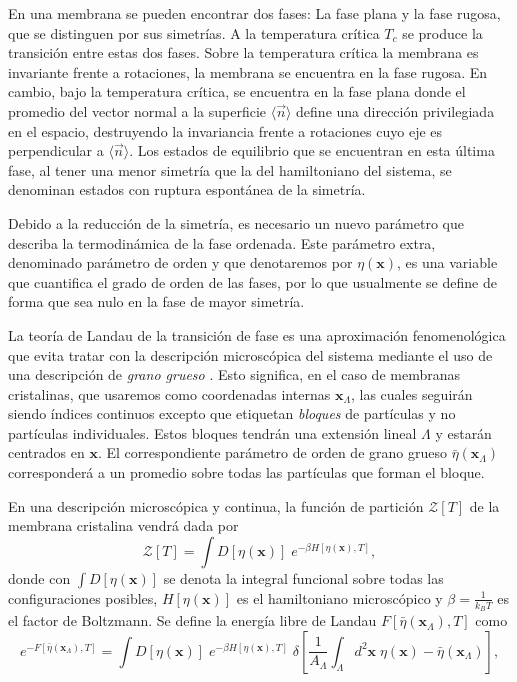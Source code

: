 En una membrana se pueden encontrar dos fases: La fase plana y la fase
rugosa, que se distinguen por sus simetrías. A la temperatura crítica $T_c$ se
produce la transición entre estas dos fases. Sobre la temperatura crítica la
membrana es invariante frente a rotaciones, 
la membrana se encuentra en la fase rugosa. En cambio, bajo la temperatura
crítica, se encuentra en la fase plana donde el promedio del vector normal a
la superficie $\langle \vec{n}\rangle$ define una dirección privilegiada en el
espacio, destruyendo la invariancia frente a rotaciones cuyo eje es
perpendicular a $\langle \vec{n}\rangle$. Los estados de equilibrio que se
encuentran en esta última fase, al tener una menor simetría que la del
hamiltoniano del sistema, se denominan estados con ruptura espontánea de la
simetría. 
 
Debido a la reducción de la simetría, es necesario un nuevo parámetro que 
describa la termodinámica de la fase ordenada. Este parámetro
extra, denominado parámetro de orden y que denotaremos por $\eta(\mathbf{x})$,
es una 
variable que cuantifica el grado de orden de
las fases, por lo que usualmente se define de forma que sea nulo en la fase
de mayor simetría.

\begin{figure}[h]
\centering
{}
\quad
{}
\end{figure}

La teoría de Landau de la transición de fase es una aproximación
fenomenológica que evita tratar con la descripción microscópica del sistema
mediante el uso de una descripción de \textit{grano grueso}
\cite{Goldenfield:Lecture_Notes}. Esto significa, 
en el caso de membranas cristalinas, que usaremos como coordenadas internas
$\mathbf{x}_{\Lambda}$, las cuales seguirán  siendo índices continuos excepto
que etiquetan \textit{bloques} de partículas y no partículas
individuales. Estos bloques tendrán una extensión lineal $\Lambda$ y estarán
centrados en $\mathbf{x}$. El correspondiente parámetro de orden de grano
grueso $\bar{\eta}(\mathbf{x}_{\Lambda})$ corresponderá a un promedio sobre
todas las partículas que forman el bloque.

En una descripción microscópica y continua, la función de partición
$\mathcal{Z}[T]$ de la membrana cristalina vendrá dada por
\begin{equation}\label{Zmicroscopica}
\mathcal{Z}[T]=\int D[\eta(\mathbf{x})]\; e^{-\beta H[\eta(\mathbf{x}),T]},
\end{equation}
donde con $\int D[\eta(\mathbf{x})]$ se denota la integral funcional sobre
todas las configuraciones posibles, $H[\eta(\mathbf{x})]$ es el hamiltoniano
microscópico y $\beta=\frac{1}{k_BT}$ es el factor de Boltzmann. Se define la
energía libre de Landau $F[\bar{\eta}(\mathbf{x}_{\Lambda}),T]$ como 
\begin{equation*}
e^{-F[\bar{\eta}(\mathbf{x}_{\Lambda}),T]}=\int D[\eta(\mathbf{x})]\; e^{-\beta
  H[\eta(\mathbf{x}),T]}
  \;\delta\left[\frac{1}{A_{\Lambda}}\int_{\Lambda} d^2\mathbf{x}\; \eta(\mathbf{x})-\bar{\eta}(\mathbf{x}_{\Lambda})\right],
\end{equation*}

